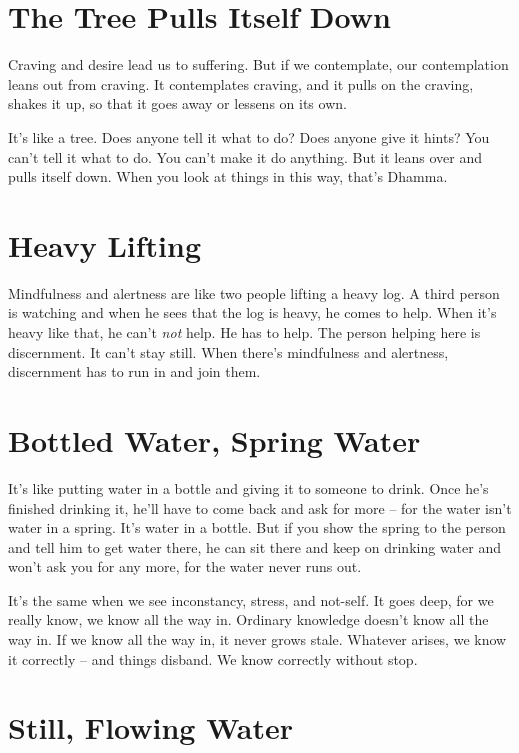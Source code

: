 \clearpage

\section{The Tree Pulls Itself Down}

Craving and desire lead us to suffering. But if we contemplate, our contemplation leans out from craving. It contemplates craving, and it pulls on the craving, shakes it up, so that it goes away or lessens on its own.

It's like a tree. Does anyone tell it what to do? Does anyone give it hints? You can't tell it what to do. You can't make it do anything. But it leans over and pulls itself down. When you look at things in this way, that's Dhamma.

\section{Heavy Lifting}

Mindfulness and alertness are like two people lifting a heavy log. A third person is watching and when he sees that the log is heavy, he comes to help. When it's heavy like that, he can't \textit{not} help. He has to help. The person helping here is discernment. It can't stay still. When there's mindfulness and alertness, discernment has to run in and join them.

\clearpage

\section{Bottled Water, Spring Water}

It's like putting water in a bottle and giving it to someone to drink. Once he's finished drinking it, he'll have to come back and ask for more -- for the water isn't water in a spring. It's water in a bottle. But if you show the spring to the person and tell him to get water there, he can sit there and keep on drinking water and won't ask you for any more, for the water never runs out.

It's the same when we see inconstancy, stress, and not-self. It goes deep, for we really know, we know all the way in. Ordinary knowledge doesn't know all the way in. If we know all the way in, it never grows stale. Whatever arises, we know it correctly -- and things disband. We know correctly without stop.

\section{Still, Flowing Water}

